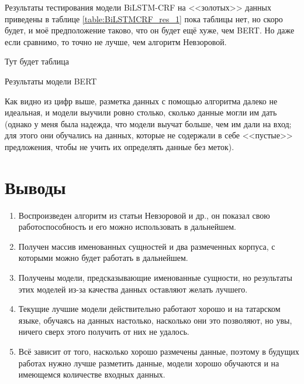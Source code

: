 Результаты тестирования модели BiLSTM-CRF на <<золотых>> данных приведены в таблице \ref{table:BiLSTMCRF_res_1} пока таблицы нет, но скоро будет, и моё предположение таково, что он будет ещё хуже, чем BERT. Но даже если сравнимо, то точно не лучше, чем алгоритм Невзоровой.

\begin{table}[h!]

Тут будет таблица

\caption{Результаты модели BERT}
\label{table:BiLSTMCRF_res_1}
\end{table}


Как видно из цифр выше, разметка данных с помощью алгоритма далеко не идеальная, и модели выучили ровно столько, сколько данные могли им дать (однако у меня была надежда, что модели выучат больше, чем им дали на вход; для этого они обучались на данных, которые не содержали в себе <<пустые>> предложения, чтобы не учить их определять данные без меток). 


\section{Выводы}

\begin{enumerate}
\item Воспроизведен алгоритм из статьи Невзоровой и др., он показал свою работоспособность и его можно использовать в дальнейшем.
\item Получен массив именованных сущностей и два размеченных корпуса, с которыми можно будет работать в дальнейшем.
\item Получены модели, предсказывающие именованные сущности, но результаты этих моделей из-за качества данных оставляют желать лучшего.
\item Текущие лучшие модели действительно работают хорошо и на татарском языке, обучаясь на данных настолько, насколько они это позволяют, но увы, ничего сверх этого получить от них не удалось. 
\item Всё зависит от того, насколько хорошо размечены данные, поэтому в будущих работах нужно лучше разметить данные, модели хорошо обучаются и на имеющемся количестве входных данных.
\end{enumerate}
























